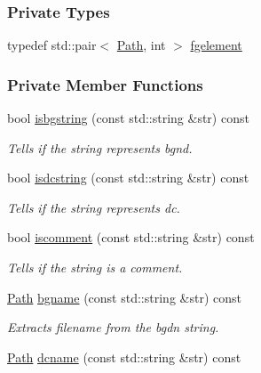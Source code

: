 \subsubsection*{Private Types}
\begin{DoxyCompactItemize}
\item 
typedef std::pair$<$ \hyperlink{classPath}{Path}, int $>$ \hyperlink{classAqSeries_aa4f8f07ad9fd3d046cb31d2d503f5355}{fgelement}
\end{DoxyCompactItemize}
\subsubsection*{Private Member Functions}
\begin{DoxyCompactItemize}
\item 
bool \hyperlink{classAqSeries_a88b4d28e9598ea6e79c430243bd768f8}{isbgstring} (const std::string \&str) const 
\begin{DoxyCompactList}\small\item\em Tells if the string represents bgnd. \item\end{DoxyCompactList}\item 
bool \hyperlink{classAqSeries_ae6a882570c03aa03bb7f64a3d2afae45}{isdcstring} (const std::string \&str) const 
\begin{DoxyCompactList}\small\item\em Tells if the string represents dc. \item\end{DoxyCompactList}\item 
bool \hyperlink{classAqSeries_ac0cd0fee2707d1f19c345ad973f79aff}{iscomment} (const std::string \&str) const 
\begin{DoxyCompactList}\small\item\em Tells if the string is a comment. \item\end{DoxyCompactList}\item 
\hyperlink{classPath}{Path} \hyperlink{classAqSeries_a7d3ebd8e00b7afda2cc7c72853007fe4}{bgname} (const std::string \&str) const 
\begin{DoxyCompactList}\small\item\em Extracts filename from the bgdn string. \item\end{DoxyCompactList}\item 
\hyperlink{classPath}{Path} \hyperlink{classAqSeries_aa3702727021391e758a52d614a1bf6f0}{dcname} (const std::string \&str) const 

\end{DoxyCompactItemize}
